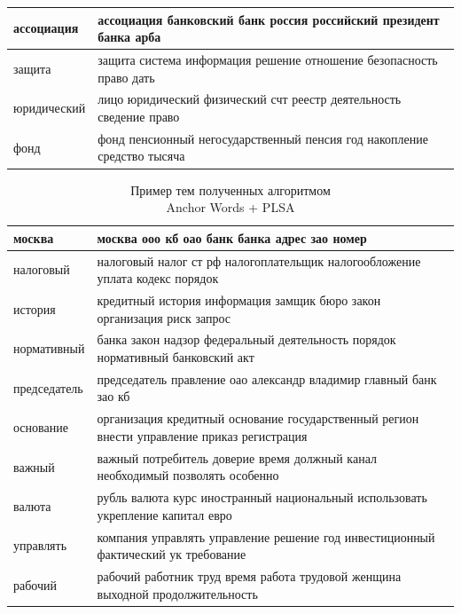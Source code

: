 \documentclass[a4paper, 14pt]{extarticle}
\begin{document}
\begin{landscape}
\begin{small}
\begin{singlespace}
\begin{table}[h]
\begin{tabular}{|l|l|}
				ассоциация &   ассоциация банковский банк россия российский президент банка арба \\ \hline
				защита &   защита система информация решение отношение безопасность право дать \\ \hline
				юридический &   лицо юридический физический счт реестр деятельность сведение право \\ \hline
				фонд &   фонд пенсионный негосударственный пенсия год накопление средство тысяча \\ \hline
				\end{tabular}
			\end{table}
		\end{singlespace}
	\end{small}
\end{landscape}

\begin{landscape}
	\begin{small}
		\begin{singlespace}
			\begin{table}[h]
			\centering
			\caption{Пример тем полученных алгоритмом \\ Anchor Words + PLSA}
			\label{my-label}
				\begin{tabular}{|l|l|}
				\hline
				москва &  москва ооо кб оао банк банка адрес зао номер \\ \hline
				налоговый &  налоговый налог ст рф налогоплательщик налогообложение уплата кодекс порядок \\ \hline
				история &  кредитный история информация замщик бюро закон организация риск запрос \\ \hline
				нормативный &  банка закон надзор федеральный деятельность порядок нормативный банковский акт \\ \hline
				председатель &  председатель правление оао александр владимир главный банк зао кб \\ \hline
				основание &  организация кредитный основание государственный регион внести управление приказ регистрация \\ \hline
				важный &  важный потребитель доверие время должный канал необходимый позволять особенно \\ \hline
				валюта &  рубль валюта курс иностранный национальный использовать укрепление капитал евро \\ \hline
				управлять &  компания управлять управление решение год инвестиционный фактический ук требование \\ \hline
				рабочий &  рабочий работник труд время работа трудовой женщина выходной продолжительность \\ \hline

\end{tabular}
\end{table}
\end{singlespace}
\end{small}
\end{landscape}
\end{document}
